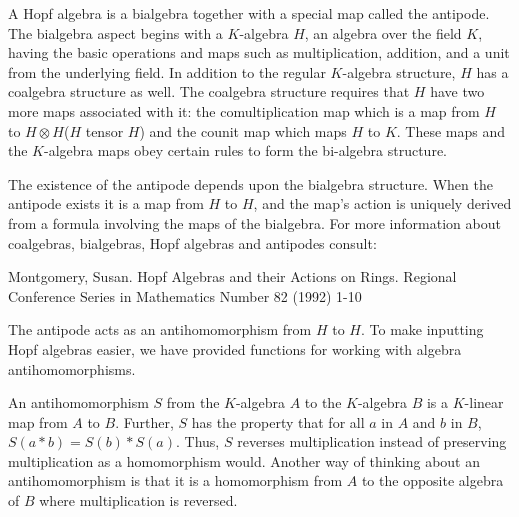 %
%
%


A Hopf algebra is a bialgebra together with a special
map called the antipode.  The bialgebra aspect begins with a $K$-algebra $H$, 
an algebra over the field $K$, having the basic operations and maps such as 
multiplication, addition, and a unit from the underlying field.  In addition
to the regular $K$-algebra structure, $H$ has a coalgebra structure as well.  The 
coalgebra structure requires that $H$ have two more maps associated with it:
the comultiplication map which is a map from $H$ to $H \otimes H$($H$ tensor $H$) and the
counit map which maps $H$ to $K$.  These maps and the 
$K$-algebra maps obey certain rules to form the bi-algebra structure.

The existence of the antipode depends upon the bialgebra structure.  When the
antipode exists it is a map from $H$ to $H$, and the map's action is uniquely derived from
a formula involving the maps of the bialgebra.
For more information about coalgebras, 
bialgebras, Hopf algebras and antipodes consult:

Montgomery, Susan. Hopf Algebras and their Actions on Rings.
Regional Conference Series in Mathematics Number 82 (1992) 1-10

The antipode acts as an antihomomorphism from $H$ to $H$.  To make inputting Hopf algebras easier, we have provided functions for working with algebra antihomomorphisms.


An antihomomorphism $S$ from the $K$-algebra $A$ to the $K$-algebra $B$ is a 
$K$-linear map from $A$ to $B$.  Further, $S$ has the property that for all $a$ in $A$ and $b$ in $B$,
$S(a*b)=S(b)*S(a)$.  Thus, $S$ reverses multiplication instead of preserving multiplication as a 
homomorphism would.  Another way of thinking about an antihomomorphism is that it is a 
homomorphism from $A$ to the opposite algebra of $B$ where multiplication is reversed.

